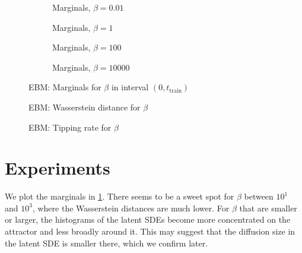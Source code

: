 \documentclass[twoside,11pt]{article}
\begin{document}
\begin{figure}
    \begin{subfigure}{.5\textwidth}
        \centering
        
        \caption{Marginals, \(\beta=0.01\)}
    \end{subfigure}
    \begin{subfigure}{.5\textwidth}
        \centering
        
        \caption{Marginals, \(\beta=1\)}
    \end{subfigure}
    \begin{subfigure}{.5\textwidth}
        \centering
        
        \caption{Marginals, \(\beta=100\)}
    \end{subfigure}
    \begin{subfigure}{.5\textwidth}
        \centering
        
        \caption{Marginals, \(\beta=10000\)}
    \end{subfigure}
    \caption{EBM: Marginals for \(\beta\) in interval \((0, t_{\text{train}})\)}
    \label{fig:first_marginals}
\end{figure}


\begin{figure}
    \begin{center}
    
    \end{center}
    \caption{EBM: Wasserstein distance for \(\beta\)}
    \label{fig:first_wasserstein}
\end{figure}

\begin{figure}
    \begin{center}
    
    \end{center}
    \caption{EBM: Tipping rate for \(\beta\)}
    \label{fig:first_tipping_rate}
\end{figure}

\section{Experiments}

We plot the marginals in \cref{fig:first_marginals}. There seems to be a sweet spot for \(\beta\) between \(10^1\) and \(10^3\), where the Wasserstein distances are much lower. For \(\beta\) that are smaller or larger, the histograms of the latent SDEs become more concentrated on the attractor and less broadly around it. This may suggest that the diffusion size in the latent SDE is smaller there, which we confirm later.
\end{document}
